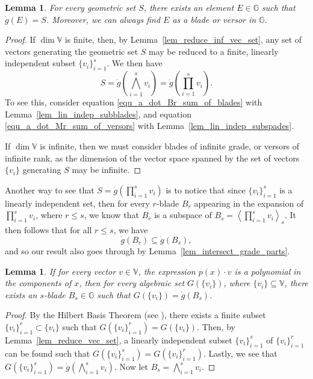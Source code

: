 \documentclass{birkjour}
\newtheorem{lem}[thm]{Lemma}
\theoremstyle{definition}
\theoremstyle{remark}
\numberwithin{equation}{section}
\newcommand{\G}{\mathbb{G}}
\newcommand{\V}{\mathbb{V}}
\newcommand{\gd}{\dot{g}}
\begin{document}
\begin{lem}\label{lem_all_geo_sets_rep_by_blades_or_versors}
For every geometric set $S$, there exists an element $E\in\G$ such that $\gd(E)=S$.
Moreover, we can always find $E$ as a blade or versor in $\G$.
\end{lem}
\begin{proof}
If $\dim\V$ is finite, then, by Lemma~\ref{lem_reduce_inf_vec_set}, any set of vectors generating the geometric
set $S$ may be reduced to a finite, linearly independent subset $\{v_i\}_{i=1}^s$.
We then have
\begin{equation*}
S=\gd\left(\bigwedge_{i=1}^s v_i\right) = \gd\left(\prod_{i=1}^s v_i\right).
\end{equation*}
To see this, consider equation \eqref{equ_a_dot_Br_sum_of_blades} with Lemma~\ref{lem_lin_indep_subblades},
and equation \eqref{equ_a_dot_Mr_sum_of_versors} with Lemma~\ref{lem_lin_indep_subspades}.

If $\dim\V$ is infinite, then we must consider blades of infinite grade, or versors of infinite rank, as the dimension
of the vector space spanned by the set of vectors $\{v_i\}$ generating $S$ may be infinite.
\end{proof}

Another way to see that $S=\gd(\prod_{i=1}^s v_i)$ is to notice that
since $\{v_i\}_{i=1}^s$
is a linearly independent set, then for every $r$-blade $B_r$ appearing in the expansion of $\prod_{i=1}^s v_i$,
where $r\leq s$, we know that $B_r$ is a subspace of $B_s=\left\langle\prod_{i=1}^s v_i\right\rangle_s$.  It then follows that
for all $r\leq s$, we have
\begin{equation*}
\gd\left(B_r\right)\subseteq\gd\left(B_s\right),
\end{equation*}
and so our result also goes through by Lemma~\ref{lem_intersect_grade_parts}.

\begin{lem}
If for every vector $v\in\V$, the expression $p(x)\cdot v$ is a polynomial in the components of $x$,
then for every algebraic set $G(\{v_i\})$, where $\{v_i\}\subseteq\V$, there exists an $s$-blade $B_s\in\G$ such that
$G(\{v_i\})=\gd(B_s)$.
\end{lem}
\begin{proof}
By the Hilbert Basis Theorem (see \cite[p. 204]{Garrity13}), there exists a finite subset $\{v_i\}_{i=1}^r\subset\{v_i\}$
such that $G(\{v_i\}_{i=1}^r)=G(\{v_i\})$.  Then, by Lemma~\ref{lem_reduce_vec_set}, a linearly independent subset $\{v_i\}_{i=1}^s$
of $\{v_i\}_{i=1}^r$ can be found such that $G(\{v_i\}_{i=1}^s)=G(\{v_i\}_{i=1}^r)$.
Lastly, we see that $G(\{v_i\}_{i=1}^s)=\gd(\bigwedge_{i=1}^s v_i)$.  Now let $B_s=\bigwedge_{i=1}^s v_i$.
\end{proof}
\end{document}
